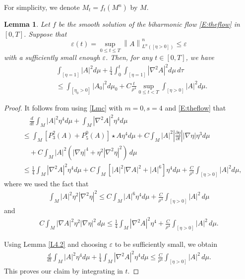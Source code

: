 \documentclass{amsart}
\newtheorem{lemma}[theorem]{Lemma}
\theoremstyle{definition}
\numberwithin{equation}{section}
\begin{document}
 For simplicity, we denote $M_t=f_t(M^n)$  by $M$.
\begin{lemma} \label{L4.3} Let $f$ be the smooth solution of the biharmonic  flow \eqref{E:theflow} in
$\left[ 0, T\right]$.
Suppose that
$$\varepsilon (t) = \sup_{0 \leq t \leq T} \left\| A \right\|^{n}_{L^n (\left[ \eta >0 \right])} \leq \varepsilon$$
with a sufficiently small enough $\varepsilon$.
Then,  for any $t\in
\left[ 0, T\right]$, we have
  \begin{align}
  &\int_{\left[ \eta = 1\right]} \left| A\right|^{2} d\mu + \frac{1}{4} \int_{0}^{t} \int_{\left[ \eta =1\right]}  \left| \nabla^{2}
  A \right|^{2}  d\mu \, d\tau \\
 & \leq \int_{\left[ \eta_{0} >0\right]} \left| A_{0} \right|^{2} d\mu_{0} + C \frac t {\rho^4}  \sup_{0 \leq t <T} \int_{\left[ \eta
 >0\right]} \left| A\right|^{2} d\mu  \mbox{.}\nonumber
   \end{align}
 \end{lemma}
\begin{proof} It follows from using  \eqref{Lmc}   with $m=0, s=4$  and \eqref{E:theflow} that
 \begin{align} \label{E:1}
  &\quad    \frac{d}{dt} \int_{M}  \left| A \right|^{2} \eta^{4} d\mu +  \int_{M}  \left| \nabla^{2} A \right|^{2} \eta^{4} d\mu
    \\
&  \leq  \int_{M} \left[P_{3}^{2}(A)+ P_{5}^{0}(A) \right] \star A \eta^{4} d\mu  + C \int_{M} \left| A \right|^{2}
|\frac {\partial \eta}{\partial t}| \left| \nabla \eta
  \right|\eta^3  d\mu \nonumber\\
  &\quad + C\int_{M}   |A|^2
(|\nabla  \eta|^4 +\eta^2|\nabla^2 \eta|^2 )\,d\mu\nonumber \\
&\leq \frac 14  \int_{M}|\nabla^2 A|^2\eta^4d\mu  + C  \int_{M}  \left
[   \left| A \right|^2   \left| \nabla A
  \right|^{2}  + |A|^6 \right]\eta^{4} d\mu  +  \frac C{\rho^4}\int_{\left[ \eta>0\right]} \left| A \right|^{2} d\mu
\mbox{,} \nonumber
\end{align}
where we used the fact that
\begin{align} \label{Gr1}
\int_{M} | A|^2 \eta^2 |\nabla^2 \eta|^2\leq C \int_{M}|A|^6  \eta^{4} d\mu + \frac C{\rho^4}  \int_{\left[ \eta>0\right]}|A|^2\,d\mu
 \end{align}
and
\begin{align} \label{Gr2}
C\int_{M}|\nabla A|^2\eta^2|\nabla \eta|^2\,d\mu\leq \frac 1 4\int_{M}|\nabla^2 A|^2\eta^4 +\frac C{\rho^4}  \int_{\left[
\eta>0\right]}|A|^2\,d\mu.
\end{align}






Using  Lemma \ref{L4.2} and choosing $\varepsilon$ to be sufficiently small, we obtain
  \begin{align} \label{E1}
   \frac{d}{dt} \int_{M}  \left| A \right|^{2} \eta^{4} d\mu + \frac{1}{4} \int_{M}  \left| \nabla^{2} A \right|^{2} \eta^{4} d\mu \leq
   \frac C{\rho^4} \int_{\left[
\eta>0\right]}|A|^2\,d\mu \mbox{.}
\end{align}
This proves our claim by integrating in $t$.
\end{proof}
\end{document}
